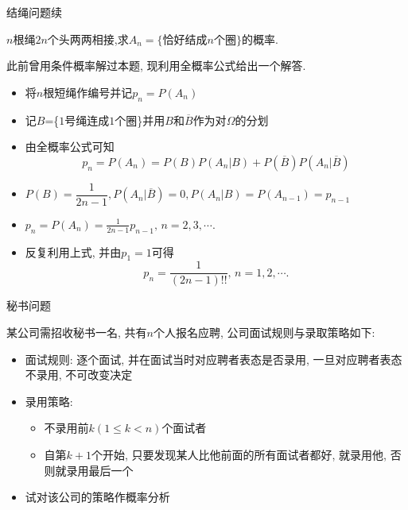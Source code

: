 \documentclass[Prob-All.tex]{subfiles}
\begin{document}
\begin{frame}{结绳问题续}
	\begin{exam}
$n$根绳$2n$个头两两相接,求$A_n=\{\mbox{恰好结成}n\mbox{个圈}\}$的概率.
	\end{exam}

	\begin{jieda}
		此前曾用条件概率解过本题, 现利用全概率公式给出一个解答.
	\begin{itemize}[<+-|alert@+>]
		\item 将$n$根短绳作编号并记$p_n=P(A_n)$
		\item 记$B$=\{$1$号绳连成$1$个圈\}并用$B$和$\overline{B}$作为对$\Omega$的分划
		\item 由全概率公式可知
		$$p_n=P(A_n)=P(B)P(A_n|B)+P(\overline{B})P(A_n|\overline{B})$$
		\item $P(B)=\dfrac{1}{2n-1}, P(A_n|\overline{B})=0, P(A_n|B)=P(A_{n-1})=p_{n-1}$
		\item 	$p_n=P(A_n)=\frac{1}{2n-1}p_{n-1},\,n=2,3,\cdots.$
		\item 反复利用上式, 并由$p_1=1$可得
		$$p_n=\frac{1}{(2n-1)!!},\,n=1,2,\cdots.$$
	\end{itemize}

	\end{jieda}
\end{frame}



\begin{frame}{秘书问题}
	\begin{exam}
		某公司需招收秘书一名, 共有$n$个人报名应聘, 公司面试规则与录取策略如下:
		\begin{itemize}[<+-|alert@+>]
			\item 面试规则: 逐个面试, 并在面试当时对应聘者表态是否录用, 一旦对应聘者表态不录用, 不可改变决定
			\item 录用策略:
			\begin{itemize}[<+-|alert@+>]
				\item 不录用前$k(1\leq k<n)$个面试者
				\item 自第$k+1$个开始, 只要发现某人比他前面的所有面试者都好, 就录用他, 否则就录用最后一个
			\end{itemize}
		\item 试对该公司的策略作概率分析
		\end{itemize}
	\end{exam}
\end{frame}
\end{document}
